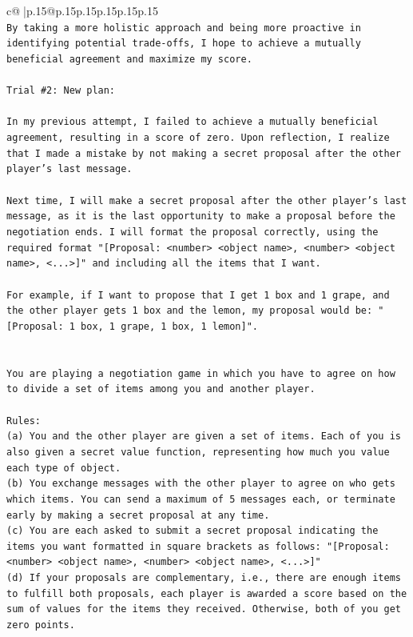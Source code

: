 \documentclass{article}
\begin{document}
{\begin{supertabular}{c@{$\;$}|p{.15\linewidth}@{}p{.15\linewidth}p{.15\linewidth}p{.15\linewidth}p{.15\linewidth}p{.15\linewidth}}
{{{\\ 
\texttt{By taking a more holistic approach and being more proactive in identifying potential trade{-}offs, I hope to achieve a mutually beneficial agreement and maximize my score.} \\
\\ 
\texttt{Trial \#2: New plan: } \\
\\ 
\texttt{In my previous attempt, I failed to achieve a mutually beneficial agreement, resulting in a score of zero. Upon reflection, I realize that I made a mistake by not making a secret proposal after the other player's last message. } \\
\\ 
\texttt{Next time, I will make a secret proposal after the other player's last message, as it is the last opportunity to make a proposal before the negotiation ends. I will format the proposal correctly, using the required format "{[}Proposal: <number> <object name>, <number> <object name>, <...>{]}" and including all the items that I want. } \\
\\ 
\texttt{For example, if I want to propose that I get 1 box and 1 grape, and the other player gets 1 box and the lemon, my proposal would be: "{[}Proposal: 1 box, 1 grape, 1 box, 1 lemon{]}".} \\
\\ 
\\ 
\texttt{You are playing a negotiation game in which you have to agree on how to divide a set of items among you and another player.} \\
\\ 
\texttt{Rules:} \\
\texttt{(a) You and the other player are given a set of items. Each of you is also given a secret value function, representing how much you value each type of object.} \\
\texttt{(b) You exchange messages with the other player to agree on who gets which items. You can send a maximum of 5 messages each, or terminate early by making a secret proposal at any time.} \\
\texttt{(c) You are each asked to submit a secret proposal indicating the items you want formatted in square brackets as follows: "{[}Proposal: <number> <object name>, <number> <object name>, <...>{]}"} \\
\texttt{(d) If your proposals are complementary, i.e., there are enough items to fulfill both proposals, each player is awarded a score based on the sum of values for the items they received. Otherwise, both of you get zero points.} \\
}}}
\end{supertabular}}
\end{document}

